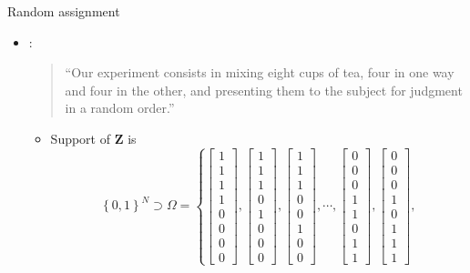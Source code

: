\documentclass[table, xcolor = {dvipsnames}, 9pt]{beamer}
\theoremstyle{plain}
\begin{document}
\begin{frame}{Random assignment}
\vfill
\begin{itemize} \vfill
\item \citet[][p.~11]{fisher1935a}: \vfill
\begin{quote} \vfill
``Our experiment consists in mixing eight cups of tea, four in one way and four in the other, and presenting them to the subject for judgment in a random order.''
\end{quote} \vfill
\begin{itemize}
\item Support of $\bm{Z}$ is \vspace{-1.5em}
\begin{equation}
\left\{0, 1\right\}^N \supset \Omega = \left\{
\begin{bmatrix} 1 \\ 1 \\ 1 \\ 1 \\ 0 \\ 0 \\ 0 \\ 0 \end{bmatrix},
\begin{bmatrix} 1 \\ 1 \\ 1 \\ 0 \\ 1 \\ 0 \\ 0 \\ 0 \end{bmatrix},
\begin{bmatrix} 1 \\ 1 \\ 1 \\ 0 \\ 0 \\ 1 \\ 0 \\ 0 \end{bmatrix},
\cdots ,
\begin{bmatrix} 0 \\ 0 \\ 0 \\ 1 \\ 1 \\ 0 \\ 1 \\ 1 \end{bmatrix},
\begin{bmatrix} 0 \\ 0 \\ 0 \\ 1 \\ 0 \\ 1 \\ 1 \\ 1 \end{bmatrix},

\end{equation}
\end{itemize}
\end{itemize}
\end{frame}
\end{document}
